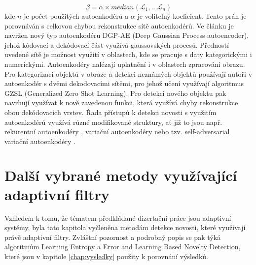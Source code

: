 \begin{equation}
\beta = \alpha \times median(\mathcal{L}_1,\dots \mathcal{L}_n)
\end{equation}
kde $n$ je počet použitých autoenkodérů a $\alpha$ je volitelný koeficient.  Tento práh je porovnáván s celkovou chybou rekonstrukce sítě autoenkodérů.
Ve článku \cite{auto5} je navržen nový typ autoenkodéru DGP-AE (Deep Gaussian Process autoencoder), jehož kódovací a dekódovací část využívá gaussovských procesů. Předností uvedené sítě je možnost využití v oblastech, kde se pracuje s daty kategorickými i numerickými. Autoenkodéry nalézají uplatnění i v oblastech zpracování obrazu. Pro kategorizaci objektů v obraze a detekci neznámých objektů používají autoři v \cite{auto6} autoenkodér s dvěmi dekodovacími sítěmi, pro jehož učení využívají algoritmus GZSL (Generalized Zero Shot Learning). Pro detekci nového objektu pak navrhují využívat k nově zavedenou funkci, která využívá chyby rekonstrukce obou dekódovacích vrstev. Řada přístupů k detekci novosti s využitím autoenkodérů využívá různé modifikované struktury, ať již to jsou např. rekurentní autoenkodéry \cite{auto7,auto8}, variační autoenkodéry \cite{auto9} nebo tzv. self-adversarial variační autoenkodéry \cite{auto10}.


\section{Další vybrané metody využívající adaptivní filtry}
Vzhledem k tomu, že tématem předkládané dizertační práce jsou adaptivní systémy, byla tato kapitola vyčleněna metodám detekce novosti, které využívají právě adaptivní filtry. Zvláštní pozornost a podrobný popis se pak týká algoritmům Learning Entropy a Error and Learning Based Novelty Detection, které jsou v kapitole \ref{chap:vysledky} použity k porovnání výsledků.
